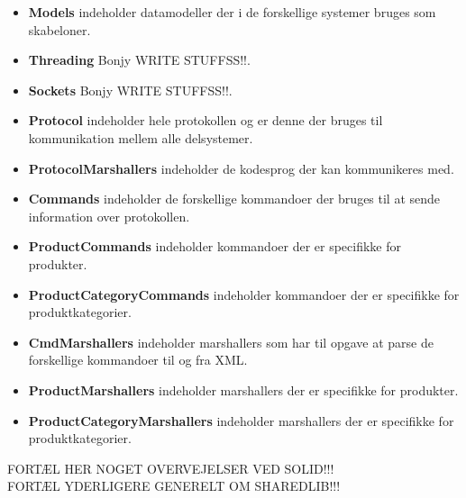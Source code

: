 \begin{itemize}
\item \textbf{Models} indeholder datamodeller der i de forskellige systemer bruges som skabeloner. 
\item \textbf{Threading} Bonjy WRITE STUFFSS!!. 
\item \textbf{Sockets} Bonjy WRITE STUFFSS!!.
\item \textbf{Protocol} indeholder hele protokollen og er denne der bruges til kommunikation mellem alle delsystemer.
\item \textbf{ProtocolMarshallers} indeholder de kodesprog der kan kommunikeres med.
\item \textbf{Commands} indeholder de forskellige kommandoer der bruges til at sende information over protokollen.
\item \textbf{ProductCommands} indeholder kommandoer der er specifikke for produkter.
\item \textbf{ProductCategoryCommands} indeholder kommandoer der er specifikke for produktkategorier.
\item \textbf{CmdMarshallers} indeholder marshallers som har til opgave at parse de forskellige kommandoer til og fra XML.
\item \textbf{ProductMarshallers} indeholder marshallers der er specifikke for produkter.
\item \textbf{ProductCategoryMarshallers} indeholder marshallers der er specifikke for produktkategorier.
\end{itemize}

FORTÆL HER NOGET OVERVEJELSER VED SOLID!!!\\

FORTÆL YDERLIGERE GENERELT OM SHAREDLIB!!!\\






